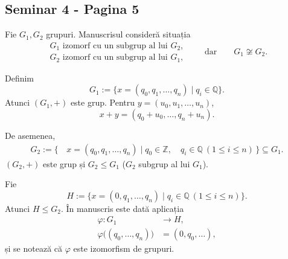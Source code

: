 
\subsection*{Seminar 4 - Pagina 5}

\noindent Fie $G_1,G_2$ grupuri. Manuscrisul consideră situația
\[
\begin{gathered}
 G_1\text{ izomorf cu un subgrup al lui }G_2,\\
 G_2\text{ izomorf cu un subgrup al lui }G_1,
\end{gathered}
\qquad\text{dar}\qquad G_1\not\cong G_2.
\]

\medskip
\noindent Definim
\[
 G_1:=\bigl\{x=(q_0,q_1,\ldots,q_n)\mid q_i\in\mathbb Q\bigr\}.
\]
Atunci $(G_1,+)$ este grup. Pentru
$y=(u_0,u_1,\ldots,u_n)$,
\[
 x+y=(q_0+u_0,\ldots,q_n+u_n).
\]

\noindent De asemenea,
\[
 \begin{aligned}
 G_2:=\bigl\{\,&x=(q_0,q_1,\ldots,q_n)\mid
     q_0\in\mathbb Z,\quad q_i\in\mathbb Q\ 
     (1\leq i\leq n)\,\bigr\}\subseteq G_1.
 \end{aligned}
\]
$(G_2,+)$ este grup și $G_2\leq G_1$
($G_2$ subgrup al lui $G_1$).

\medskip
\noindent Fie
\[
 H:=\bigl\{x=(0,q_1,\ldots,q_n)\mid
     q_i\in\mathbb Q\ (1\leq i\leq n)\bigr\}.
\]
Atunci $H\leq G_2$. În manuscris este dată aplicația
\[
 \begin{aligned}
 \varphi:G_1&\longrightarrow H,\\
 \varphi\bigl((q_0,\ldots,q_n)\bigr)&=(0,q_0,\ldots),
 \end{aligned}
\]
și se notează că $\varphi$ este izomorfism de grupuri.

